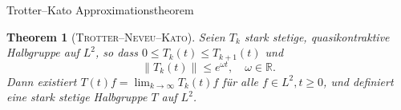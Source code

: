 \documentclass[handout]{beamer}
\newtheorem{thm}{Theorem}
\newtheorem{lem}[thm]{Lemma}
\theoremstyle{break}
\begin{document}
%

\begin{frame}{Trotter--Kato Approximationstheorem}
\begin{thm}[\textsc{Trotter--Neveu--Kato}]
Seien $T_k$ stark stetige, quasikontraktive Halbgruppe  auf $L^2$, so dass $0\le T_k(t) \le T_{k+1}(t)$ und
\begin{equation}
\|T_k(t)\|\le e^{\omega t},\quad \omega \in \mathbb R.
\end{equation}  
Dann existiert $T(t)f=\lim_{k\to \infty} T_k(t)f$ für alle $f\in L^2, t\ge 0$, und definiert eine stark stetige Halbgruppe $T$ auf $L^2$. 
\end{thm}
\end{frame}
\end{document}
